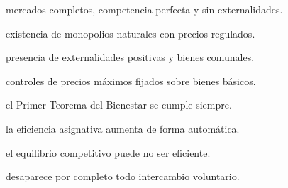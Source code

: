 \begin{opts}
    \item mercados completos, competencia perfecta y sin externalidades.
    \item existencia de monopolios naturales con precios regulados.
    \item presencia de externalidades positivas y bienes comunales.
    \item controles de precios máximos fijados sobre bienes básicos.
\end{opts}

\begin{opts}
    \item el Primer Teorema del Bienestar se cumple siempre.
    \item la eficiencia asignativa aumenta de forma automática.
    \item el equilibrio competitivo puede no ser eficiente.
    \item desaparece por completo todo intercambio voluntario.
\end{opts}
